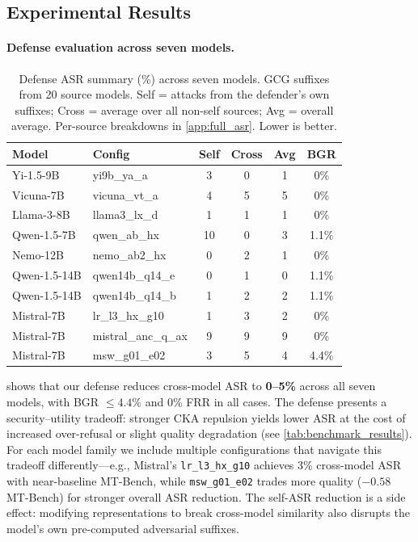 \subsection{Experimental Results}

\paragraph{Defense evaluation across seven models.}

\begin{table}[ht]
\centering
\caption{Defense ASR summary (\%) across seven models. GCG suffixes from 20 source models. Self = attacks from the defender's own suffixes; Cross = average over all non-self sources; Avg = overall average. Per-source breakdowns in \cref{app:full_asr}. Lower is better.}
\label{tab:defense_results}
\setlength{\tabcolsep}{4pt}
\begin{tabular}{@{}llcccc@{}}
\toprule
\textbf{Model} & \textbf{Config} & \textbf{Self} & \textbf{Cross} & \textbf{Avg} & \textbf{BGR} \\
\midrule
Yi-1.5-9B      & yi9b\_ya\_a        & 3  & 0  & 1  & 0\%   \\
Vicuna-7B      & vicuna\_vt\_a      & 4  & 5  & 5  & 0\%   \\
Llama-3-8B     & llama3\_lx\_d      & 1  & 1  & 1  & 0\%   \\
Qwen-1.5-7B    & qwen\_ab\_hx       & 10 & 0  & 3  & 1.1\% \\
Nemo-12B       & nemo\_ab2\_hx      & 0  & 2  & 1  & 0\%   \\
Qwen-1.5-14B   & qwen14b\_q14\_e    & 0  & 1  & 0  & 1.1\% \\
Qwen-1.5-14B   & qwen14b\_q14\_b    & 1  & 2  & 2  & 1.1\% \\
Mistral-7B     & lr\_l3\_hx\_g10    & 1  & 3  & 2  & 0\%   \\
Mistral-7B     & mistral\_anc\_q\_ax & 9 & 9  & 9  & 0\%   \\
Mistral-7B     & msw\_g01\_e02      & 3  & 5  & 4  & 4.4\% \\
\bottomrule
\end{tabular}
\setlength{\tabcolsep}{6pt}
\end{table}

 shows that our defense reduces cross-model ASR to \textbf{0--5\%} across all seven models, with BGR $\leq 4.4\%$ and 0\% FRR in all cases.
The defense presents a security--utility tradeoff: stronger CKA repulsion yields lower ASR at the cost of increased over-refusal or slight quality degradation (see \cref{tab:benchmark_results}).
For each model family we include multiple configurations that navigate this tradeoff differently---e.g., Mistral's \texttt{lr\_l3\_hx\_g10} achieves 3\% cross-model ASR with near-baseline MT-Bench, while \texttt{msw\_g01\_e02} trades more quality ($-0.58$ MT-Bench) for stronger overall ASR reduction.
The self-ASR reduction is a side effect: modifying representations to break cross-model similarity also disrupts the model's own pre-computed adversarial suffixes.

